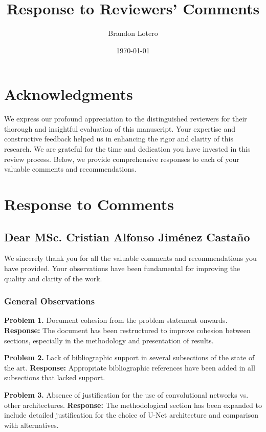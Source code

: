 \documentclass[12pt,a4paper]{article}
\title{\textbf{Response to Reviewers' Comments}}
\author{Brandon Lotero}
\date{\today}
\begin{document}
\maketitle

\section*{Acknowledgments}

We express our profound appreciation to the distinguished reviewers
for their thorough and insightful evaluation of this manuscript. Your
expertise and constructive feedback helped us in enhancing the rigor
and clarity of this research. We are grateful
for the time and dedication you have invested in this review process.
Below, we provide comprehensive responses to each of your valuable
comments and recommendations.

\section*{Response to Comments}

\subsection*{Dear MSc. Cristian Alfonso Jiménez Castaño}

We sincerely thank you for all the valuable comments and
recommendations you have provided. Your observations have been
fundamental for improving the quality and clarity of the work.

\subsubsection*{General Observations}

\textbf{Problem 1.} Document cohesion from the problem statement onwards.
\textbf{Response:} The document has been restructured to improve
cohesion between sections, especially in the methodology and
presentation of results.

\textbf{Problem 2.} Lack of bibliographic support in several
subsections of the state of the art.
\textbf{Response:} Appropriate bibliographic references have been
added in all subsections that lacked support.

\textbf{Problem 3.} Absence of justification for the use of
convolutional networks vs. other architectures.
\textbf{Response:} The methodological section has been expanded to
include detailed justification for the choice of U-Net architecture
and comparison with alternatives.
\end{document}
